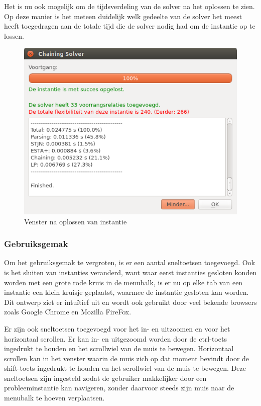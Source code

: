 Het is nu ook mogelijk om de tijdsverdeling van de solver na het oplossen te zien. Op deze manier is het meteen duidelijk welk gedeelte van de solver het meest heeft toegedragen aan de totale tijd die de solver nodig had om de instantie op te lossen.

\begin{figure}[H]
    \center
    \includegraphics[width=.7\textwidth]{../images/solver-dialog.png}
    \caption{Venster na oplossen van instantie}
    \label{fig:solver-dialog}
\end{figure}

\subsubsection{Gebruiksgemak}
\label{sec:gebruiksgemak}
Om het gebruiksgemak te vergroten, is er een aantal sneltoetsen toegevoegd. Ook is het sluiten van instanties veranderd, want waar eerst instanties gesloten konden worden met een grote rode kruis in de menubalk, is er nu op elke tab van een instantie een klein kruisje geplaatst, waarmee de instantie gesloten kan worden. Dit ontwerp ziet er intu\"itief uit en wordt ook gebruikt door veel bekende browsers zoals Google Chrome en Mozilla FireFox.

Er zijn ook sneltoetsen toegevoegd voor het in- en uitzoomen en voor het horizontaal scrollen. Er kan in- en uitgezoomd worden door de ctrl-toets ingedrukt te houden en het scrollwiel van de muis  te bewegen. Horizontaal scrollen kan in het venster waarin de muis zich op dat moment bevindt door de shift-toets ingedrukt te houden en het scrollwiel van de muis te bewegen. Deze sneltoetsen zijn ingesteld zodat de gebruiker makkelijker door een probleeminstantie kan navigeren, zonder daarvoor steeds zijn muis naar de menubalk te hoeven verplaatsen.

